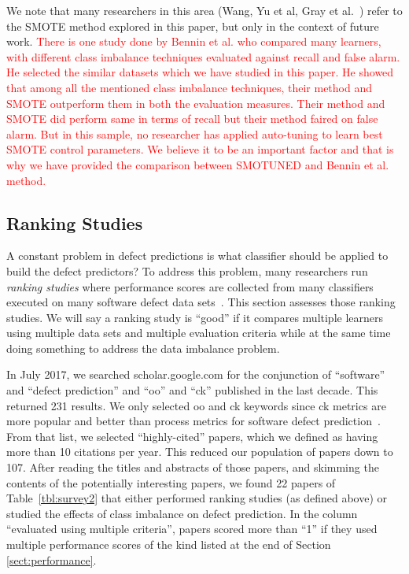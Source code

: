 \documentclass[sigconf,review, anonymous]{acmart}
\theoremstyle{break}
\theoremstyle{break}
\newcommand{\tion}[1]{{Section }\ref{sect:#1}}
\newcommand{\sma}{{\sc SMOTE}}
\newcommand{\smb}{{\sc SMOTUNED}}
\begin{document}
We note that  
many researchers in this area  (Wang, Yu et al, Gray et al.~\cite{gray2009using,yuperformance,wang2013using}) refer to the {\sma} method explored in this paper,  but only in the context of future work. 
\textcolor{red}{There is one study done by Bennin et al.\cite{bennin2017mahakil} who compared many learners, with different class imbalance techniques evaluated against recall and false alarm. He selected the similar datasets which we have studied in this paper. He showed that among all the mentioned class imbalance techniques, their method and {\sma} outperform them in both the evaluation measures. Their method and {\sma} did perform same in terms of recall but their method faired on false alarm. But in this sample, no researcher has  applied auto-tuning to learn best {\sma} control parameters. We believe it to be an important factor and that is why we have provided the comparison between {\smb} and Bennin et al. method.}
 

\subsection{Ranking Studies}
\label{sect:rank}

A constant problem in defect predictions is what  classifier should be applied to  build  the  defect  predictors?
To address this problem, many researchers run {\em ranking studies} where  performance scores 
are collected from  many classifiers  executed on  many software defect data sets~\cite{lessmann2008benchmarking,hall2012systematic,elish2008predicting,menzies2010defect,gondra2008applying,radjenovic2013software,jiang2008techniques,wang2013using,mende2009revisiting,li2012sample,khoshgoftaar2010attribute,jiang2009variance,ghotra2015revisiting,jiang2008can,tantithamthavorn2016automated,fu2016tuning}.
This section assesses those ranking studies. We will say a ranking study is ``good'' if it compares multiple learners using multiple data sets and multiple evaluation criteria
while at the same time doing something to address the data imbalance problem.

 In July 2017,  we searched
scholar.google.com for the conjunction of ``software'' and ``defect prediction'' and ``oo'' and ``ck'' published in the last decade. This returned 231 results.
We only selected oo and ck keywords since ck metrics are more popular and better than process metrics for software defect prediction~\cite{radjenovic2013software}.
From that list, we selected ``highly-cited'' papers, which we defined as having more than 10 citations per year. This reduced our population of papers down to 107.
After reading the titles and abstracts of those papers, and skimming the contents of the potentially interesting papers, we found 22 papers of Table~\ref{tbl:survey2} that either performed ranking studies
(as defined above) or studied the effects of class imbalance on defect prediction. In the column ``evaluated using
multiple criteria'',
papers scored more than ``1'' if they used multiple performance scores  of the kind listed at the end of \tion{performance}. 
\end{document}
